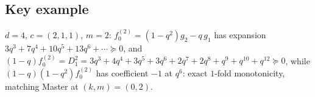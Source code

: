\documentclass[11pt]{article}
\begin{document}
\subsection*{Key example}
$d=4$, $c=(2,1,1)$, $m=2$: $f_0^{(2)}=(1-q^2)g_2-q\,g_1$ has expansion
$3q^3+7q^4+10q^5+13q^6+\cdots\succeq 0$, and
$(1-q)f_0^{(2)}=D_1^2=3q^3+4q^4+3q^5+3q^6+2q^7+2q^8+q^9+q^{10}+q^{12}
\succeq 0$, while $(1-q)(1-q^2)f_0^{(2)}$ has coefficient $-1$ at $q^6$:
exact $1$-fold monotonicity, matching Master at $(k,m)=(0,2)$.
\end{document}

